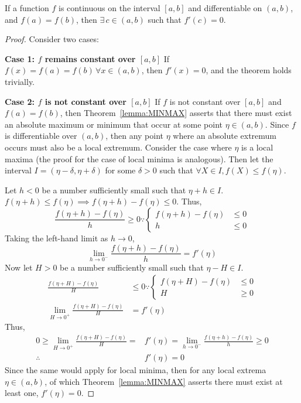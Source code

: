 \begin{theorem}\label{lemma:ROLLES}
	If a function $f$ is continuous on the interval $[a,b]$ and differentiable on $(a,b)$, and $f(a)=f(b)$, then $\exists\,c\in(a,b)$ such that $f'(c)=0$.
	\begin{proof}
		Consider two cases:
		
		\textbf{Case 1: $f$ remains constant over $[a,b]$}\newline
		If $f(x)=f(a)=f(b)\,\forall x\in(a,b)$, then $f'(x)=0$, and the theorem holds trivially. 
		
		\textbf{Case 2: $f$ is not constant over $[a,b]$}\newline
		If $f$ is not constant over $[a,b]$ and $f(a)=f(b)$, then Theorem~\ref{lemma:MINMAX} asserts that there must exist an absolute maximum
		or minimum that occur at some point $\eta\in(a,b)$. Since $f$ is differentiable over $(a,b)$, then any point $\eta$ where an absolute
		extremum occurs must also be a local extremum. Consider the case where $\eta$ is a local maxima (the proof for the case of local minima
		is analogous). Then let the interval $I=(\eta-\delta,\eta+\delta)$ for some $\delta>0$ such that $\forall X\in I,f(X)\leq f(\eta)$.

		Let $h<0$ be a number sufficiently small such that $\eta+h\in I$. $f(\eta+h)\leq f(\eta)\implies f(\eta+h)-f(\eta)\leq0$. Thus,
		$$
			\frac{f(\eta+h)-f(\eta)}{h}\geq0\because\left\{\begin{matrix}
				f(\eta+h)-f(\eta)&\leq0\\
				h&\leq0
			\end{matrix}\right.
		$$
		Taking the left-hand limit as $h\rightarrow0$,
		$$
			\lim_{h\rightarrow0^-}\frac{f(\eta+h)-f(\eta)}{h}=f'(\eta)
		$$
		Now let $H>0$ be a number sufficiently small such that $\eta-H\in I$.
		\begin{align*}
			\frac{f(\eta+H)-f(\eta)}{H}&\leq0\because\left\{\begin{matrix}
				f(\eta+H)-f(\eta)&\leq0\\
				H&\geq0
			\end{matrix}\right.\\
			\lim_{H\rightarrow0^+}\frac{f(\eta+H)-f(\eta)}{H}&=f'(\eta)
		\end{align*}
		Thus,
		\begin{align*}
			0\geq\lim_{H\rightarrow0^+}\frac{f(\eta+H)-f(\eta)}{H}=&f'(\eta)=\lim_{h\rightarrow0^-}\frac{f(\eta+h)-f(\eta)}{h}\geq0\\
			\therefore\,&f'(\eta)=0
		\end{align*}
		Since the same would apply for local minima, then for any local extrema $\eta\in(a,b)$, of which Theorem~\ref{lemma:MINMAX} asserts
		there must exist at least one, $f'(\eta)=0$.
	\end{proof}
\end{theorem}
